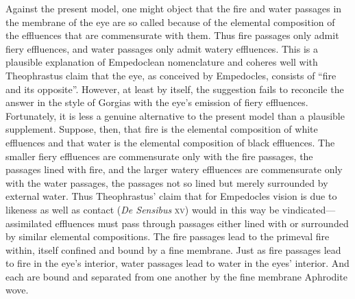 
Against the present model, one might object that the fire and water passages in the membrane of the eye are so called because of the elemental composition of the effluences that are commensurate with them. Thus fire passages only admit fiery effluences, and water passages only admit watery effluences. This is a plausible explanation of Empedoclean nomenclature and coheres well with Theophrastus claim that the eye, as conceived by Empedocles, consists of ``fire and its opposite''. However, at least by itself, the suggestion fails to reconcile the answer in the style of Gorgias with the eye's emission of fiery effluences. Fortunately, it is less a genuine alternative to the present model than a plausible supplement. Suppose, then, that fire is the elemental composition of white effluences and that water is the elemental composition of black effluences. The smaller fiery effluences are commensurate only with the fire passages, the passages lined with fire, and the larger watery effluences are commensurate only with the water passages, the passages not so lined but merely surrounded by external water. Thus Theophrastus' claim that for Empedocles vision is due to likeness as well as contact (\emph{De Sensibus} \textsc{xv}) would in this way be vindicated---assimilated effluences must pass through passages either lined with or surrounded by similar elemental compositions. The fire passages lead to the primeval fire within, itself confined and bound by a fine membrane. Just as fire passages lead to fire in the eye's interior, water passages lead to water in the eyes' interior. And each are bound and separated from one another by the fine membrane Aphrodite wove.

